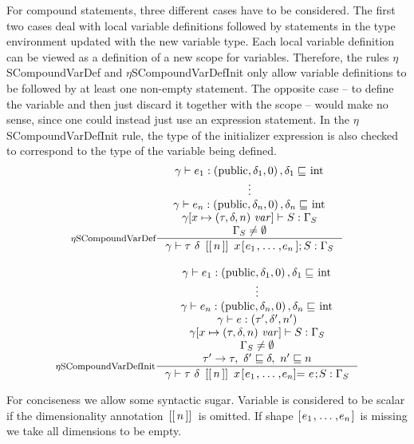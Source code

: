 \documentclass[a4paper, 10pt, draft]{report}
\newcommand{\mycode}[1]{\ensuremath{\mbox{\lstinline{#1}}}}
\begin{document}
For compound statements, three different cases have to be considered. The first
two cases deal with local variable definitions followed by statements in the
type environment updated with the new variable type. Each local variable
definition can be viewed as a definition of a new scope for variables.
Therefore, the rules $\eta$SCompoundVarDef and $\eta$SCompoundVarDefInit only
allow variable definitions to be followed by at least one non-empty statement.
The opposite case -- to define the variable and then just discard it together
with the scope -- would make no sense, since one could instead just use an
expression statement. In the $\eta$SCompoundVarDefInit rule, the type of the
initializer expression is also checked to correspond to the type of the
variable being defined.
\[\begin{array}{c}
\inference[$\eta$SCompoundVarDef]{
  \gamma |- e_1 : \left( \mycode{public}, \delta_1, 0 \right), \delta_1 \sqsubseteq \mycode{int} \\
  \vdots \\
  \gamma |- e_n : \left( \mycode{public}, \delta_n, 0 \right), \delta_n \sqsubseteq \mycode{int}\\
  \gamma[x \mapsto (\tau, \delta, n)\ \mathit{var}] |- S : \Gamma_S \\
  \Gamma_S \neq \emptyset
}{
  \gamma |- \tau\ \delta\ \mycode{[[}n\mycode{]]}\ x\mycode{[} e_1 \mycode{,} \ldots \mycode{,} e_n \mycode{];} S : \Gamma_S
} \\[2em]
\inference[$\eta$SCompoundVarDefInit]{
  \gamma |- e_1 : \left( \mycode{public}, \delta_1, 0 \right), \delta_1 \sqsubseteq \mycode{int} \\
  \vdots \\
  \gamma |- e_n : \left( \mycode{public}, \delta_n, 0 \right), \delta_n \sqsubseteq \mycode{int}\\
  \gamma |- e : \left( \tau', \delta', n' \right) \\
  \gamma[x \mapsto (\tau, \delta, n)\ \mathit{var}] |- S : \Gamma_S \\
  \Gamma_S \neq \emptyset \\
  \tau' \to \tau,\ \delta' \sqsubseteq \delta,\ n' \sqsubseteq n
}{
  \gamma |- \tau\ \delta\ \mycode{[[}n\mycode{]]}\ x\mycode{[} e_1 \mycode{,} \ldots \mycode{,} e_n  \mycode{]=}\ e\mycode{;} S : \Gamma_S
}
\end{array}\]

For conciseness we allow some syntactic sugar. Variable is considered to be
scalar if the dimensionality annotation $\mycode{[[}n\mycode{]]}$ is omitted.
If shape $\mycode{[} e_1 \mycode{,} \ldots \mycode{,} e_n  \mycode{]}$ is
missing we take all dimensions to be empty.
\end{document}
